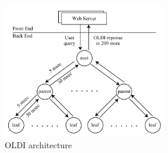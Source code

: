 \begin{figure}[t]
    \begin{center}
    \includegraphics[autoebb, width=200pt]{./img/OLDI.pdf}
    \caption{OLDI architecture}
    \label{fig:oldi_tree}
    \end{center}
\end{figure}